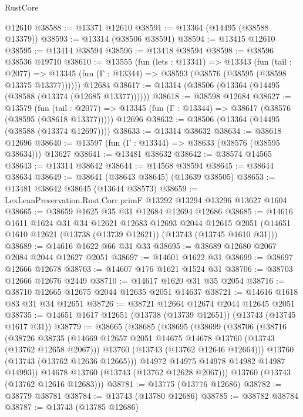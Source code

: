 \begin{lexlean}{RustCore}
\begin{coremodule}
    @12610
@38588 := @13371 @12610
@38591 := @13364 (@14495 (@38588 @13379))
@38593 := @13314 (@38506 @38591)
@38594 := @13415 @12610
@38595 := @13414 @38594
@38596 := @13418 @38594
@38598 := @38596 @38536 @19710
@38610 := @13555
    (fun (lets : @13341) =>
    @13343
      (fun (tail : @2077) =>
      @13345 (fun (Γ : @13344) => @38593 (@38576 (@38595 (@38598 @13375 @13377))))))
    @12684
@38617 := @13314 (@38506 (@13364 (@14495 (@38588 (@13374 (@12685 @13377))))))
@38618 := @38598 @12684
@38627 := @13579
    (fun (tail : @2077) => @13345 (fun (Γ : @13344) => @38617 (@38576 (@38595 (@38618 @13377)))))
    @12696
@38632 := @38506 (@13364 (@14495 (@38588 (@13374 @12697))))
@38633 := @13314 @38632
@38634 := @38618 @12696
@38640 := @13597 (fun (Γ : @13344) => @38633 (@38576 (@38595 @38634))) @13627
@38641 := @13481 @38632
@38642 := @38574 @14565
@38643 := @13314 @38642
@38644 := @14568 @38594
@38645 := @38644 @38634
@38649 := @38641 (@38643 @38645) (@13639 @38505)
@38653 := @13481 @38642 @38645 (@13644 @38573)
@38659 := LexLeanPreservation.Rust.Corr.primF @13292 @13294 @13296 @13627 @1604
@38665 := @38659 @1625 @35 @31 @12684 @12694 @12686
@38685 := @14616
    @1611
    @1624
    @31
    @34
    @12621
    @12683
    @12693
    @2044
    @12615
    @2051
    (@14651 @1610 @12621 (@13738 (@13739 @12621)) (@13743 (@13745 @1610 @31)))
@38689 := @14616 @1622 @66 @31 @33
@38695 := @38689 @12680 @2067 @2084 @2044 @12627 @2051
@38697 := @14601 @1622 @31
@38699 := @38697 @12666 @12678
@38703 := @14607 @176 @1621 @1524 @31
@38706 := @38703 @12666 @12676 @2449
@38710 := @14617 @1620 @31 @35 @2054
@38716 := @38710 @12665 @12675 @2044 @12635 @2051 @14637
@38721 := @14616 @1618 @83 @31 @34 @12651
@38726 := @38721 @12664 @12674 @2044 @12645 @2051
@38735 := @14651 @1617 @12651 (@13738 (@13739 @12651)) (@13743 (@13745 @1617 @31))
@38779 := @38665
    (@38685
      (@38695
        (@38699
          (@38706
            (@38716
              (@38726
                @38735
                (@14669 @12657 @2051 @14675 @14678 @13760 (@13743 (@13762 @12658 @2067)))
                @13760
                (@13743 (@13762 @12646 @12664)))
              @13760
              (@13743 (@13762 @12636 @12665)))
            @14972
            @14975
            @14978
            @14982
            @14987
            @14993))
        @14678
        @13760
        (@13743 (@13762 @12628 @2067)))
      @13760
      (@13743 (@13762 @12616 @12683)))
@38781 := @13775 (@13776 @12686)
@38782 := @38779 @38781
@38784 := @13743 (@13780 @12686)
@38785 := @38782 @38784
@38787 := @13743 (@13785 @12686)

\end{coremodule}
\end{lexlean}
